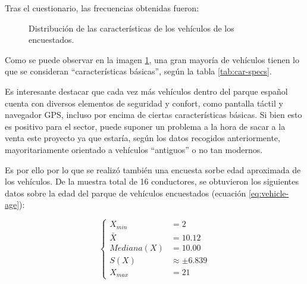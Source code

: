 Tras el cuestionario, las frecuencias obtenidas fueron:

\begin{figure}[H]

  \caption{Distribución de las características de los vehículos de los encuestados.}
  \label{fig:vehicle-specs}
\end{figure}

Como se puede observar en la imagen \ref{fig:vehicle-specs}, una gran mayoría de vehículos
tienen lo que se consideran ``características básicas'', según la tabla \ref{tab:car-specs}.

Es interesante destacar que cada vez más vehículos dentro del parque español cuenta con
diversos elementos de seguridad y confort, como pantalla táctil y navegador \ac{GPS},
incluso por encima de ciertas características básicas. Si bien esto es positivo para
el sector, puede suponer un problema a la hora de sacar a la venta este proyecto ya
que estaría, según los datos recogidos anteriormente, mayoritariamente orientado
a vehículos ``antiguos'' o no tan modernos.

Es por ello por lo que se realizó también una encuesta sorbe edad aproximada de
los vehículos. De la muestra total de 16 conductores, se obtuvieron los siguientes
datos sobre la edad del parque de vehículos encuestados (ecuación \ref{eq:vehicle-age}):

\begin{equation}\label{eq:vehicle-age}
  \left\{
  \begin{aligned}
    X_{min}               & = 2               \\
    \bar{X}               & = 10.12           \\
    Mediana\left(X\right) & = 10.00           \\
    S\left(X\right)       & \approx \pm 6.839 \\
    X_{max}               & = 21
  \end{aligned}
  \right.
\end{equation}

